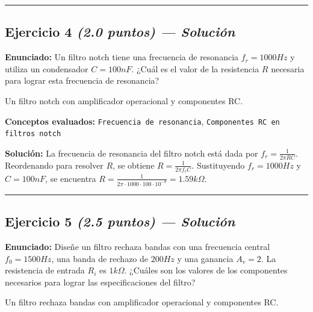 \documentclass[11pt,a4paper]{article}
\begin{document}
\vspace{4pt}
\rule{\linewidth}{0.2pt}
\vspace{6pt}



\subsection*{Ejercicio 4 \normalfont\normalsize\textit{(2.0 puntos) --- Solución}}
\textbf{Enunciado:}
Un filtro notch tiene una frecuencia de resonancia $f_r = 1000 Hz$ y utiliza un condensador $C = 100 nF$. ¿Cuál es el valor de la resistencia $R$ necesaria para lograr esta frecuencia de resonancia?

  \begin{tcolorbox}[colback=gray!5, colframe=gray!40, fonttitle=\bfseries, title={Diagrama sugerido}]
    Un filtro notch con amplificador operacional y componentes RC.
  \end{tcolorbox}

\vspace{2mm}
\textbf{Conceptos evaluados:} \texttt{Frecuencia de resonancia}, \texttt{Componentes RC en filtros notch}

\vspace{2mm}
\textbf{Solución:}
La frecuencia de resonancia del filtro notch está dada por $f_r = \frac{1}{2\pi RC}$. Reordenando para resolver $R$, se obtiene $R = \frac{1}{2\pi f_r C}$. Sustituyendo $f_r = 1000 Hz$ y $C = 100 nF$, se encuentra $R = \frac{1}{2\pi \cdot 1000 \cdot 100 \cdot 10^{-9}} = 1.59 k\Omega$.

\vspace{4pt}
\rule{\linewidth}{0.2pt}
\vspace{6pt}



\subsection*{Ejercicio 5 \normalfont\normalsize\textit{(2.5 puntos) --- Solución}}
\textbf{Enunciado:}
Diseñe un filtro rechaza bandas con una frecuencia central $f_0 = 1500 Hz$, una banda de rechazo de $200 Hz$ y una ganancia $A_v = 2$. La resistencia de entrada $R_i$ es $1 k\Omega$. ¿Cuáles son los valores de los componentes necesarios para lograr las especificaciones del filtro?

  \begin{tcolorbox}[colback=gray!5, colframe=gray!40, fonttitle=\bfseries, title={Diagrama sugerido}]
    Un filtro rechaza bandas con amplificador operacional y componentes RC.
  \end{tcolorbox}
\end{document}
